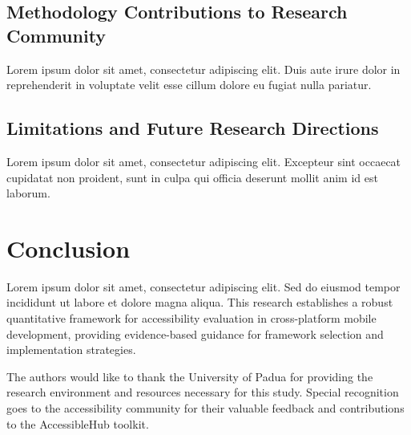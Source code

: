 \documentclass[sigconf]{acmart} %
\begin{document}
\subsection{Methodology Contributions to Research Community}
Lorem ipsum dolor sit amet, consectetur adipiscing elit. Duis aute irure dolor in reprehenderit in voluptate velit esse cillum dolore eu fugiat nulla pariatur.

\subsection{Limitations and Future Research Directions}
Lorem ipsum dolor sit amet, consectetur adipiscing elit. Excepteur sint occaecat cupidatat non proident, sunt in culpa qui officia deserunt mollit anim id est laborum.

\section{Conclusion}
\label{sec:conclusion}

Lorem ipsum dolor sit amet, consectetur adipiscing elit. Sed do eiusmod tempor incididunt ut labore et dolore magna aliqua. This research establishes a robust quantitative framework for accessibility evaluation in cross-platform mobile development, providing evidence-based guidance for framework selection and implementation strategies.

\begin{acks}
The authors would like to thank the University of Padua for providing the research environment and resources necessary for this study. Special recognition goes to the accessibility community for their valuable feedback and contributions to the AccessibleHub toolkit.
\end{acks}



\end{document}
